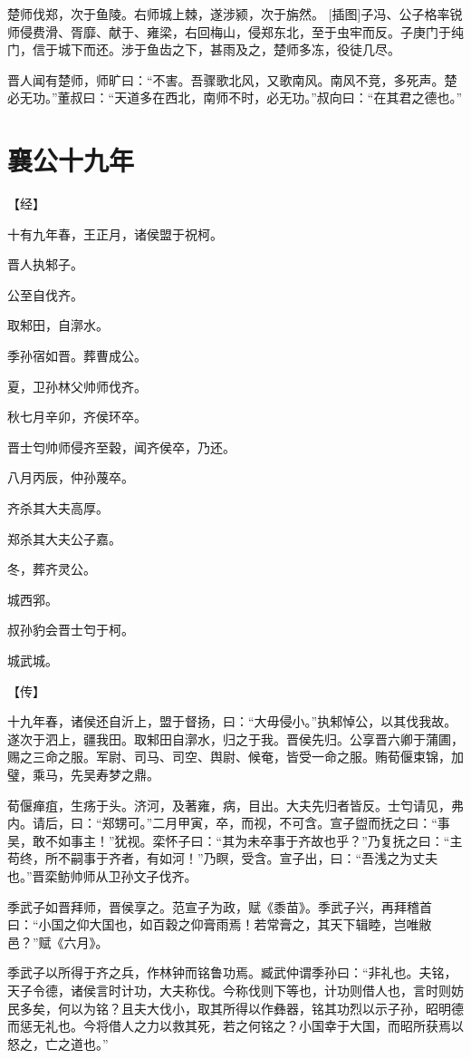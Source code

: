 \documentclass[a4paper,12pt,UTF8,twoside]{ctexbook}
\begin{document}
楚师伐郑，次于鱼陵。右师城上棘，遂涉颍，次于旃然。 [插图]子冯、公子格率锐师侵费滑、胥靡、献于、雍梁，右回梅山，侵郑东北，至于虫牢而反。子庚门于纯门，信于城下而还。涉于鱼齿之下，甚雨及之，楚师多冻，役徒几尽。

晋人闻有楚师，师旷曰：“不害。吾骤歌北风，又歌南风。南风不竞，多死声。楚必无功。”董叔曰：“天道多在西北，南师不时，必无功。”叔向曰：“在其君之德也。”

\chapter{襄公十九年}



【经】

十有九年春，王正月，诸侯盟于祝柯。

晋人执邾子。

公至自伐齐。

取邾田，自漷水。

季孙宿如晋。葬曹成公。

夏，卫孙林父帅师伐齐。

秋七月辛卯，齐侯环卒。

晋士匄帅师侵齐至穀，闻齐侯卒，乃还。

八月丙辰，仲孙蔑卒。

齐杀其大夫高厚。

郑杀其大夫公子嘉。

冬，葬齐灵公。

城西郛。

叔孙豹会晋士匄于柯。

城武城。

【传】

十九年春，诸侯还自沂上，盟于督扬，曰：“大毋侵小。”执邾悼公，以其伐我故。遂次于泗上，疆我田。取邾田自漷水，归之于我。晋侯先归。公享晋六卿于蒲圃，赐之三命之服。军尉、司马、司空、舆尉、候奄，皆受一命之服。贿荀偃束锦，加璧，乘马，先吴寿梦之鼎。

荀偃瘅疽，生疡于头。济河，及著雍，病，目出。大夫先归者皆反。士匄请见，弗内。请后，曰：“郑甥可。”二月甲寅，卒，而视，不可含。宣子盥而抚之曰：“事吴，敢不如事主！”犹视。栾怀子曰：“其为未卒事于齐故也乎？”乃复抚之曰：“主苟终，所不嗣事于齐者，有如河！”乃瞑，受含。宣子出，曰：“吾浅之为丈夫也。”晋栾鲂帅师从卫孙文子伐齐。

季武子如晋拜师，晋侯享之。范宣子为政，赋《黍苗》。季武子兴，再拜稽首曰：“小国之仰大国也，如百穀之仰膏雨焉！若常膏之，其天下辑睦，岂唯敝邑？”赋《六月》。

季武子以所得于齐之兵，作林钟而铭鲁功焉。臧武仲谓季孙曰：“非礼也。夫铭，天子令德，诸侯言时计功，大夫称伐。今称伐则下等也，计功则借人也，言时则妨民多矣，何以为铭？且夫大伐小，取其所得以作彝器，铭其功烈以示子孙，昭明德而惩无礼也。今将借人之力以救其死，若之何铭之？小国幸于大国，而昭所获焉以怒之，亡之道也。”
\end{document}
